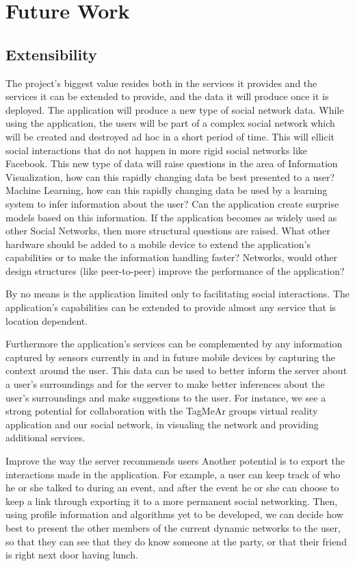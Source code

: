 \documentclass[11pt]{article}
\begin{document}
\section{Future Work}
\subsection{Extensibility}

The project's biggest value resides both in the services it provides and the services it can be extended to provide, and the data it will produce once it is deployed. The application will produce a new type of social network data. While using the application, the users will be part of a complex social network which will be created and destroyed ad hoc in a short period of time. This will ellicit social interactions that do not happen in more rigid social networks like Facebook. This new type of data will raise questions in the area of Information Visualization, how can this rapidly changing data be best presented to a user? Machine Learning, how can this rapidly changing data be used by a learning system to infer information about the user? Can the application create surprise models based on this information. If the application becomes as widely used as other Social Networks, then more structural questions are raised. What other hardware should be added to a mobile device to extend the application's capabilities or to make the information handling faster? Networks, would other design structures (like peer-to-peer) improve the performance of the application?

By no means is the application limited only to facilitating social interactions. The application's capabilities can be extended to provide almost any service that is location dependent. 


Furthermore the application's services can be complemented by any information captured by sensors currently in and in future mobile devices by capturing the context around the user. This data can be used to better inform the server about a user's surroundings and for the server to make better inferences about the user's surroundings and make suggestions to the user. For instance, we see a strong potential for collaboration with the TagMeAr groups virtual reality application and our social network, in visualing the network and providing additional services.





Improve the way the server recommends users
Another potential is to export the interactions made in the application. For example, a user can keep track of who he or she talked to during an event, and after the event he or she can choose to keep a link through exporting it to a more permanent social networking. Then, using profile information and algorithms yet to be developed, we can decide how best to present the other members of the current dynamic networks to the user, so that they can see that they do know someone at the party, or that their friend is right next door having lunch.
\end{document}
